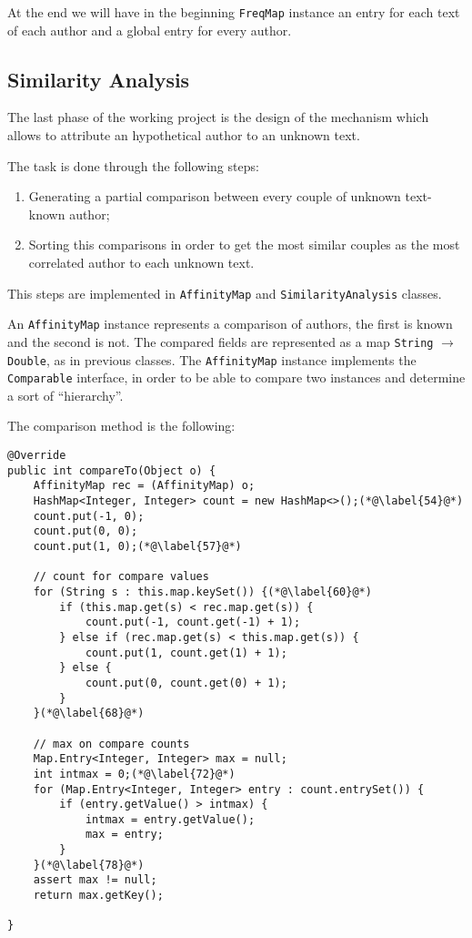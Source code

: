 \documentclass[a4paper,11pt, twoside]{article}
\begin{document}
		\bigskip
		\noindent
		At the end we will have in the beginning \lstinline|FreqMap| instance an entry for each text of each author and a global entry for every author.
	
	\subsection{Similarity Analysis}
		The last phase of the working project is the design of the mechanism which allows to attribute an hypothetical author to an unknown text.
		
		\noindent
		The task is done through the following steps: 
		\begin{enumerate}
			\item Generating a partial comparison between every couple of unknown text-known author;
			\item Sorting this comparisons in order to get the most similar couples as the most correlated author to each unknown text.
		\end{enumerate}

		\noindent
		This steps are implemented in \lstinline|AffinityMap| and \lstinline|SimilarityAnalysis| classes.
		
		\noindent
		An \lstinline|AffinityMap| instance represents a comparison of authors, the first is known and the second is not. The compared fields are represented as a map \lstinline|String| $\to$ \lstinline|Double|, as in previous classes. The \lstinline|AffinityMap| instance implements the \lstinline|Comparable| interface, in order to be able to compare two instances and determine a sort of ``hierarchy''.
		
		\noindent
		The comparison method is the following:
		\begin{lstlisting}[firstnumber=51,caption={AffinityMap comparison method}, captionpos=b, label={lst:comparemethod}]
@Override
public int compareTo(Object o) {
	AffinityMap rec = (AffinityMap) o;
	HashMap<Integer, Integer> count = new HashMap<>();(*@\label{54}@*)
	count.put(-1, 0);
	count.put(0, 0);
	count.put(1, 0);(*@\label{57}@*)
	
	// count for compare values
	for (String s : this.map.keySet()) {(*@\label{60}@*)
		if (this.map.get(s) < rec.map.get(s)) {
			count.put(-1, count.get(-1) + 1);
		} else if (rec.map.get(s) < this.map.get(s)) {
			count.put(1, count.get(1) + 1);
		} else {
			count.put(0, count.get(0) + 1);
		}
	}(*@\label{68}@*)
	
	// max on compare counts
	Map.Entry<Integer, Integer> max = null;
	int intmax = 0;(*@\label{72}@*)
	for (Map.Entry<Integer, Integer> entry : count.entrySet()) {
		if (entry.getValue() > intmax) {
			intmax = entry.getValue();
			max = entry;
		}
	}(*@\label{78}@*)
	assert max != null;
	return max.getKey();

}
	 \end{lstlisting}
	 
\end{document}
